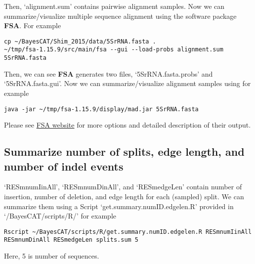 \documentclass[11pt]{article}
\begin{document}
Then, `alignment.sum' contains pairwise alignment samples. Now we can summarize/visualize multiple sequence alignment using the software package \textbf{FSA}. For example
\begin{lstlisting}
cp ~/BayesCAT/Shim_2015/data/5SrRNA.fasta .
~/tmp/fsa-1.15.9/src/main/fsa --gui --load-probs alignment.sum 5SrRNA.fasta
\end{lstlisting}

Then, we can see \textbf{FSA} generates two files, `5SrRNA.fasta.probs' and `5SrRNA.fasta.gui'. Now we can summarize/visualize alignment samples using for example
\begin{lstlisting}
java -jar ~/tmp/fsa-1.15.9/display/mad.jar 5SrRNA.fasta
\end{lstlisting}

Please see \href{http://fsa.sourceforge.net/}{FSA website} for more options and detailed description of their output.

\subsection{Summarize number of splits, edge length, and number of indel events}
\label{sec-3-3}
`RESmnumIinAll', `RESmnumDinAll', and `RESmedgeLen' contain number of insertion, number of deletion, and edge length for each (sampled) split. We can summarize them using a Script `get.summary.numID.edgelen.R' provided in `/BayesCAT/scripts/R/' for example
\begin{lstlisting}
Rscript ~/BayesCAT/scripts/R/get.summary.numID.edgelen.R RESmnumIinAll RESmnumDinAll RESmedgeLen splits.sum 5
\end{lstlisting}
Here, 5 is number of sequences. 
\end{document}
